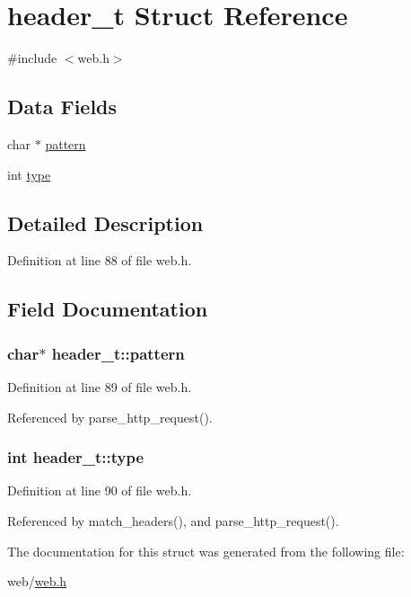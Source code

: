 \hypertarget{structheader__t}{}\section{header\+\_\+t Struct Reference}
\label{structheader__t}


{\ttfamily \#include $<$web.\+h$>$}

\subsection*{Data Fields}
\begin{DoxyCompactItemize}
\item 
char $\ast$ \hyperlink{structheader__t_a389d7564d1b1fd7b7ace82e15525e18c}{pattern}
\item 
int \hyperlink{structheader__t_a1f179d0a706f9ec29e1ac8ef9e67b8af}{type}
\end{DoxyCompactItemize}


\subsection{Detailed Description}


Definition at line 88 of file web.\+h.



\subsection{Field Documentation}
\subsubsection[{\texorpdfstring{pattern}{pattern}}]{\setlength{\rightskip}{0pt plus 5cm}char$\ast$ header\+\_\+t\+::pattern}\hypertarget{structheader__t_a389d7564d1b1fd7b7ace82e15525e18c}{}\label{structheader__t_a389d7564d1b1fd7b7ace82e15525e18c}


Definition at line 89 of file web.\+h.



Referenced by parse\+\_\+http\+\_\+request().

\subsubsection[{\texorpdfstring{type}{type}}]{\setlength{\rightskip}{0pt plus 5cm}int header\+\_\+t\+::type}\hypertarget{structheader__t_a1f179d0a706f9ec29e1ac8ef9e67b8af}{}\label{structheader__t_a1f179d0a706f9ec29e1ac8ef9e67b8af}


Definition at line 90 of file web.\+h.



Referenced by match\+\_\+headers(), and parse\+\_\+http\+\_\+request().



The documentation for this struct was generated from the following file\+:\begin{DoxyCompactItemize}
\item 
web/\hyperlink{web_8h}{web.\+h}\end{DoxyCompactItemize}
